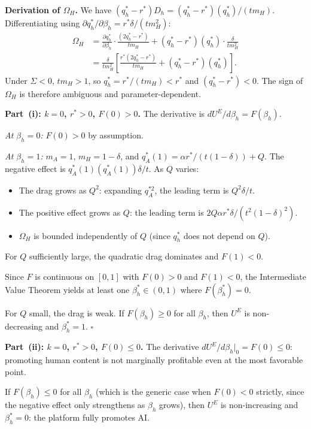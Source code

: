 \documentclass[mnsc,nonblindrev]{informs3_NoOR}
\begin{document}
\medskip\noindent\textbf{Derivation of $\Omega_H$.}
We have $(q_h^*-r^*)D_h = (q_h^*-r^*)(q_h^*)/(tm_H)$. Differentiating using $\partial q_h^*/\partial\beta_h = r^*\delta/(tm_H^2)$:
\begin{align*}
\Omega_H &= \frac{\partial q_h^*}{\partial\beta_h}\cdot\frac{(2q_h^*-r^*)}{tm_H} + (q_h^*-r^*)(q_h^*)\cdot\frac{\delta}{tm_H^2} \\[4pt]
&= \frac{\delta}{tm_H^2}\!\left[\frac{r^*(2q_h^*-r^*)}{tm_H}+(q_h^*-r^*)(q_h^*)\right].
\end{align*}
Under $\Sigma<0$, $tm_H>1$, so $q_h^*=r^*/(tm_H)<r^*$ and $(q_h^*-r^*)<0$. The sign of $\Omega_H$ is therefore ambiguous and parameter-dependent.
 
\medskip\noindent\textbf{Part~(i): $k=0$, $r^*>0$, $F(0)>0$.}
The derivative is $dU^E/d\beta_h = F(\beta_h)$.
 
\emph{At $\beta_h=0$:} $F(0)>0$ by assumption.
 
\emph{At $\beta_h=1$:} $m_A=1$, $m_H=1-\delta$, and $q_A^*(1) = \alpha r^*/(t(1-\delta))+Q$. The negative effect is $q_A^*(1)(q_A^*(1))\delta/t$. As $Q$ varies:
\begin{itemize}
\item The drag grows as $Q^2$: expanding $q_A^{*2}$, the leading term is $Q^2\delta/t$.
\item The positive effect grows as $Q$: the leading term is $2Q\alpha r^*\delta/(t^2(1-\delta)^2)$.
\item $\Omega_H$ is bounded independently of $Q$ (since $q_h^*$ does not depend on $Q$).
\end{itemize}
For $Q$ sufficiently large, the quadratic drag dominates and $F(1)<0$.
 
Since $F$ is continuous on $[0,1]$ with $F(0)>0$ and $F(1)<0$, the Intermediate Value Theorem yields at least one $\beta_h^* \in (0,1)$ where $F(\beta_h^*)=0$.
 
For $Q$ small, the drag is weak. If $F(\beta_h) \geq 0$ for all $\beta_h$, then $U^E$ is non-decreasing and $\beta_h^*=1$. \hfill$\square$
 
\medskip\noindent\textbf{Part~(ii): $k=0$, $r^*>0$, $F(0) \leq 0$.}
The derivative $dU^E/d\beta_h\big|_0 = F(0) \leq 0$: promoting human content is not marginally profitable even at the most favorable point.
 
If $F(\beta_h) \leq 0$ for all $\beta_h$ (which is the generic case when $F(0)<0$ strictly, since the negative effect only strengthens as $\beta_h$ grows), then $U^E$ is non-increasing and $\beta_h^*=0$: the platform fully promotes AI.
 
\end{document}
